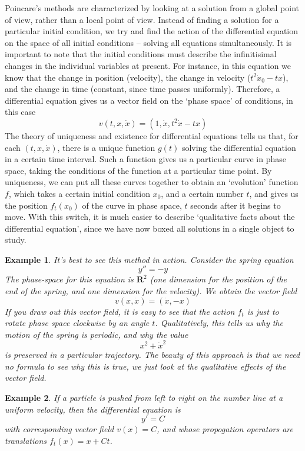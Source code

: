 \documentclass{article}
\theoremstyle{plain}
\newtheorem*{example}{Example}
\theoremstyle{definition}
\begin{document}
Poincare's methods are characterized by looking at a solution from a global point of view, rather than a local point of view. Instead of finding a solution for a particular initial condition, we try and find the action of the differential equation on the space of all initial conditions -- solving all equations simultaneously. It is important to note that the initial conditions must describe the infinitisimal changes in the individual variables at present. For instance, in this equation we know that the change in position (velocity), the change in velocity ($t^2 \dot{x}_0 - tx$), and the change in time (constant, since time passes uniformly). Therefore, a differential equation gives us a vector field on the `phase space' of conditions, in this case
%
\[ v(t,x,\dot{x}) = (1,\dot{x},t^2 \dot{x} - tx) \]
%
The theory of uniqueness and existence for differential equations tells us that, for each $(t,x,\dot{x})$, there is a unique function $g(t)$ solving the differential equation in a certain time interval. Such a function gives us a particular curve in phase space, taking the conditions of the function at a particular time point. By uniqueness, we can put all these curves together to obtain an `evolution' function $f$, which takes a certain initial condition $x_0$, and a certain number $t$, and gives us the position $f_t(x_0)$ of the curve in phase space, $t$ seconds after it begins to move. With this switch, it is much easier to describe `qualitative facts about the differential equation', since we have now boxed all solutions in a single object to study.

\begin{example}
    It's best to see this method in action. Consider the spring equation
    \[ y'' = -y \]
    The phase-space for this equation is $\mathbf{R}^2$ (one dimension for the position of the end of the spring, and one dimension for the velocity). We obtain the vector field
    \[ v(x,\dot{x}) = (\dot{x}, -x) \]
    If you draw out this vector field, it is easy to see that the action $f_t$ is just to rotate phase space clockwise by an angle $t$. Qualitatively, this tells us why the motion of the spring is periodic, and why the value
    \[ x^2 + \dot{x}^2 \]
    is preserved in a particular trajectory. The beauty of this approach is that we need no formula to see why this is true, we just look at the qualitative effects of the vector field.
\end{example}

\begin{example}
    If a particle is pushed from left to right on the number line at a uniform velocity, then the differential equation is
    \[ y' = C \]
    with corresponding vector field $v(x) = C$, and whose propogation operators are translations $f_t(x) = x + Ct$.
\end{example}
\end{document}
